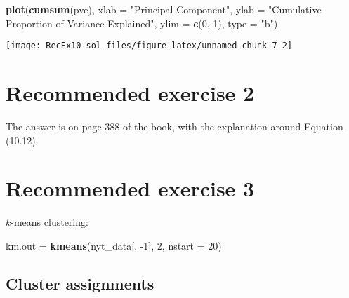 \documentclass[]{article}
\newenvironment{Shaded}{\begin{snugshade}}{\end{snugshade}}
\newcommand{\DataTypeTok}[1]{\textcolor[rgb]{0.13,0.29,0.53}{#1}}
\newcommand{\DecValTok}[1]{\textcolor[rgb]{0.00,0.00,0.81}{#1}}
\newcommand{\KeywordTok}[1]{\textcolor[rgb]{0.13,0.29,0.53}{\textbf{#1}}}
\newcommand{\NormalTok}[1]{#1}
\newcommand{\OperatorTok}[1]{\textcolor[rgb]{0.81,0.36,0.00}{\textbf{#1}}}
\newcommand{\StringTok}[1]{\textcolor[rgb]{0.31,0.60,0.02}{#1}}
\begin{document}
\begin{Shaded}
\begin{Highlighting}[]
\KeywordTok{plot}\NormalTok{(}\KeywordTok{cumsum}\NormalTok{(pve), }\DataTypeTok{xlab =} \StringTok{"Principal Component"}\NormalTok{, }\DataTypeTok{ylab =} \StringTok{"Cumulative Proportion of Variance Explained"}\NormalTok{, }
    \DataTypeTok{ylim =} \KeywordTok{c}\NormalTok{(}\DecValTok{0}\NormalTok{, }\DecValTok{1}\NormalTok{), }\DataTypeTok{type =} \StringTok{"b"}\NormalTok{)}
\end{Highlighting}
\end{Shaded}

\begin{center}\texttt{[image: RecEx10-sol\_files/figure-latex/unnamed-chunk-7-2]} \end{center}

\hypertarget{recommended-exercise-2}{%
\section{Recommended exercise 2}\label{recommended-exercise-2}}

The answer is on page 388 of the book, with the explanation around
Equation (10.12).

\hypertarget{recommended-exercise-3}{%
\section{Recommended exercise 3}\label{recommended-exercise-3}}

\(k\)-means clustering:

\begin{Shaded}
\begin{Highlighting}[]
\NormalTok{km.out =}\StringTok{ }\KeywordTok{kmeans}\NormalTok{(nyt_data[, }\DecValTok{-1}\NormalTok{], }\DecValTok{2}\NormalTok{, }\DataTypeTok{nstart =} \DecValTok{20}\NormalTok{)}
\end{Highlighting}
\end{Shaded}

\hypertarget{cluster-assignments}{%
\subsection{Cluster assignments}\label{cluster-assignments}}

\begin{Shaded}
\end{Shaded}
\end{document}
